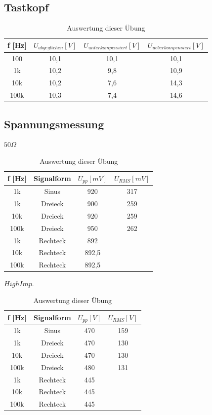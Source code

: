 \subsection{Tastkopf}


\begin{table}[h]
	\centering
	\begin{tabular}{|c|c|c|c|}
	\hline 
	f [Hz]		& $U_{abgeglichen} [V]$	& $U_{unterkompensiert} [V]$	& $U_{ueberkompensiert} [V]$		\\ 
	\hline 
	100		& 10,1			& 10,1				& 10,1		\\ 
	\hline 
	1k		& 10,2			& 9,8					& 10,9		\\ 
	\hline 
	10k		& 10,2			& 7,6					& 14,3		\\ 
	\hline 
	100k		& 10,3			& 7,4					& 14,6		\\ 
	\hline 
	\end{tabular}
	\caption{Auswertung dieser Übung}
\end{table}



\subsection{Spannungsmessung}


$50\Omega$
\begin{table}[h]
	\centering
	\begin{tabular}{|c|c|c|c|}
	\hline 
	f [Hz]		& Signalform		& $U_{pp} [mV]$	& $U_{RMS} [mV]$		\\ 
	\hline 
	1k		& Sinus		& 920			& 317			\\ 
	\hline 
	1k		& Dreieck		& 900			& 259			\\ 
	\hline 
	10k		& Dreieck		& 920			& 259			\\ 
	\hline 
	100k		& Dreieck		& 950			& 262			\\ 
	\hline 
	1k		& Rechteck		& 892			& 		\\ 
	\hline 
	10k		& Rechteck		& 892,5		& 		\\ 
	\hline 
	100k		& Rechteck		& 892,5		& 		\\ 
	\hline 
	\end{tabular}
	\caption{Auswertung dieser Übung}
\end{table}

$High Imp.$
\begin{table}[!h]
	\centering
	\begin{tabular}{|c|c|c|c|}
	\hline 
	f [Hz]		& Signalform		& $U_{pp} [V]$	& $U_{RMS} [V]$		\\ 
	\hline 
	1k		& Sinus		& 470			& 159			\\ 
	\hline 
	1k		& Dreieck		& 470			& 130			\\ 
	\hline 
	10k		& Dreieck		& 470			& 130			\\ 
	\hline 
	100k		& Dreieck		& 480			& 131			\\ 
	\hline 
	1k		& Rechteck		& 445			& 		\\ 
	\hline 
	10k		& Rechteck		& 445			& 		\\ 
	\hline 
	100k		& Rechteck		& 445			& 		\\ 
	\hline 
	\end{tabular}
	\caption{Auswertung dieser Übung}
\end{table}


